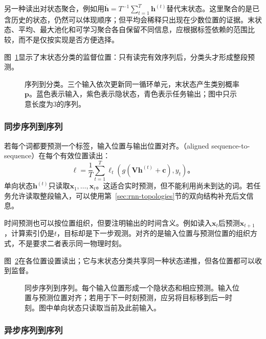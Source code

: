 另一种读出对状态聚合，例如用$\overline{\bm{h}}=T^{-1}\sum_{t=1}^{T}\bm{h}^{(t)}$替代末状态。这里聚合的是已含历史的状态，仍然可以体现顺序；但平均会稀释只出现在少数位置的证据。末状态、平均、最大池化和可学习聚合各自保留不同信息，应根据标签依赖的范围比较，而不是仅按实现是否方便选择。


图~\ref{fig:rnn-sequence-classification}显示了末状态分类的监督位置：只有读完有效序列后，分类头才形成整段预测。
\begin{figure}[htb]
  \centering
  
  \caption{序列到分类。三个输入依次更新同一循环单元，末状态产生类别概率$\bm p$。蓝色表示输入，紫色表示隐状态，青色表示任务输出；图中只示意长度为3的序列。}
  \label{fig:rnn-sequence-classification}
\end{figure}

\subsubsection{同步序列到序列}
\label{sec:rnn-aligned-sequences}

若每个词都要预测一个标签，输入位置与输出位置对齐。（aligned sequence-to-sequence）在每个有效位置读出：
\begin{equation}
  \ell=\frac{1}{T}\sum_{t=1}^{T}
  \ell_t\!\left(g(\bm{V}\bm{h}^{(t)}+\bm{c}),y_t\right)\text{。}
  \label{eq:rnn-aligned-loss}
\end{equation}
单向状态$\bm{h}^{(t)}$只读取$\bm{x}_1,\ldots,\bm{x}_t$。这适合实时预测，但不能利用尚未到达的词。若任务允许读取整段输入，可以使用第~\ref{sec:rnn-topologies}节的双向结构补充后文信息。

时间预测也可以按位置组织，但要注明输出的时间含义。例如读入$\bm{x}_t$后预测$\bm{x}_{t+1}$，计算索引仍是$t$，目标却是下一步观测。对齐的是输入位置与预测位置的组织方式，不是要求二者表示同一物理时刻。


图~\ref{fig:rnn-aligned-sequences}在各位置设置读出；它与末状态分类共享同一种状态递推，但各位置都可以收到监督。
\begin{figure}[htb]
  \centering
  
  \caption{同步序列到序列。每个输入位置形成一个隐状态和相应预测。输入位置与预测位置对齐；若用于下一时刻预测，应另将目标移到后一时刻。图中单向状态只读取当前及此前输入。}
  \label{fig:rnn-aligned-sequences}
\end{figure}

\subsubsection{异步序列到序列}
\label{sec:rnn-encoder-decoder}


